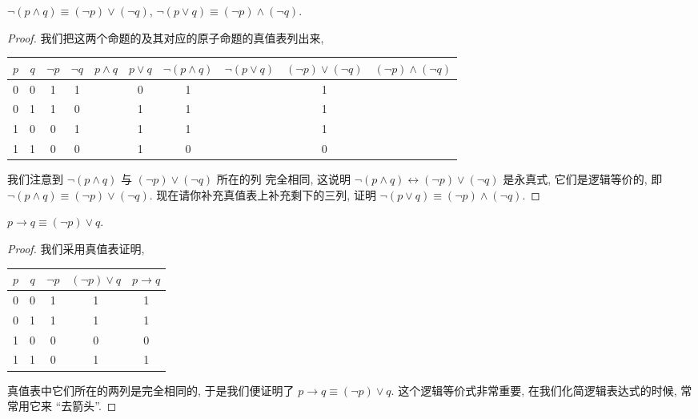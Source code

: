 \documentclass[10pt,UTF8]{book} %
\begin{document}
\begin{example}[De Morgan]
    $\lnot (p \wedge q) \equiv (\lnot p) \vee (\lnot q)$,
    \quad 
    $\lnot (p \vee q) \equiv (\lnot p) \wedge (\lnot q)$.
    \begin{proof}
        我们把这两个命题的及其对应的原子命题的真值表列出来,
        \begin{center}
            \begin{tabular}{cc|cccccccc}
                \hline
                $p$ & $q$ & $\lnot p$ & $\lnot q$ & $p \wedge q$ & $p \vee q$ &
                $\lnot(p \wedge q)$ & $\lnot(p \vee q)$ 
                & $(\lnot p) \vee (\lnot q)$
                & $(\lnot p) \wedge (\lnot q)$ \\
                \hline 
                0 & 0 & 1 & 1 &  & 0 & 1 & & 1 &\\ 
                0 & 1 & 1 & 0 &  & 1 & 1 & & 1 &\\ 
                1 & 0 & 0 & 1 &  & 1 & 1 & & 1 &\\ 
                1 & 1 & 0 & 0 &  & 1 & 0 & & 0 &\\
                \hline
            \end{tabular}
        \end{center}
    我们注意到 $\lnot(p \wedge q)$ 与 $(\lnot p)\vee(\lnot q)$ 所在的列
    完全相同, 这说明 
    $\lnot (p \wedge q) \leftrightarrow (\lnot p)\vee(\lnot q)$
    是永真式, 它们是逻辑等价的, 即 
    $\lnot (p \wedge q) \equiv (\lnot p) \vee (\lnot q)$. 
    现在请你补充真值表上补充剩下的三列,
    证明 $\lnot (p \vee q) \equiv (\lnot p) \wedge (\lnot q)$.
    \end{proof}
\end{example}

\begin{example}
    $p \rightarrow q \equiv (\lnot p) \vee q$.
    \begin{proof}
        我们采用真值表证明,
        \begin{center}
        \begin{tabular}{cc|ccc}
            \hline 
            $p$ & $q$ & $\lnot p$ & $(\lnot p) \vee q$ & $p \rightarrow q$ \\ 
            \hline 
            0 & 0 & 1 & 1 & 1\\ 
            0 & 1 & 1 & 1 & 1\\ 
            1 & 0 & 0 & 0  & 0\\
            1 & 1 & 0 & 1 & 1 \\ 
            \hline
        \end{tabular}
        \end{center}
        真值表中它们所在的两列是完全相同的, 于是我们便证明了 
        $p \rightarrow q \equiv (\lnot p) \vee q$.
        这个逻辑等价式非常重要, 在我们化简逻辑表达式的时候, 常常用它来 “去箭头”.
    \end{proof}
\end{example}
\end{document}
